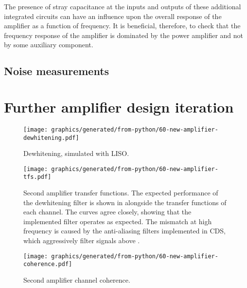 The presence of stray capacitance at the inputs and outputs of these additional integrated circuits can have an influence upon the overall response of the amplifier as a function of frequency. It is beneficial, therefore, to check that the frequency response of the amplifier is dominated by the power amplifier and not by some auxiliary component.

\subsection{Noise measurements}


\section{\label{sec:hv-amplifier-alt}Further amplifier design iteration}


\begin{figure}
  \centering
  \texttt{[image: graphics/generated/from-python/60-new-amplifier-dewhitening.pdf]}
  \caption{Dewhitening, simulated with LISO.}
  \label{fig:new-amplifier-dewhitening}
\end{figure}

\begin{figure}
  \centering
  \texttt{[image: graphics/generated/from-python/60-new-amplifier-tfs.pdf]}
  \caption{Second amplifier transfer functions. The expected performance of the dewhitening filter is shown in  alongside the transfer functions of each channel. The curves agree closely, showing that the implemented filter operates as expected. The mismatch at high frequency is caused by the anti-aliasing filters implemented in CDS, which aggressively filter signals above .}
  \label{fig:new-amplifier-tfs}
\end{figure}

\begin{figure}
  \centering
  \texttt{[image: graphics/generated/from-python/60-new-amplifier-coherence.pdf]}
  \caption{Second amplifier channel coherence.}
  \label{fig:new-amplifier-coherence}
\end{figure}

